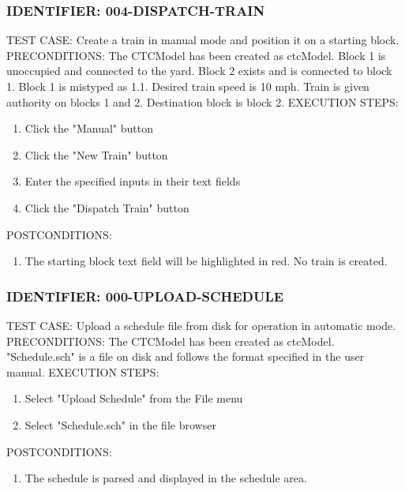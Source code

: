 \documentclass{scrreprt}
\begin{document}
\subsubsection{IDENTIFIER: 004-DISPATCH-TRAIN}
TEST CASE: Create a train in manual mode and position it on a starting block.
PRECONDITIONS: The CTCModel has been created as ctcModel. Block 1 is unoccupied and connected to the yard. Block 2 exists and is connected to block 1. Block 1 is mistyped as 1.1. Desired train speed is 10 mph. Train is given authority on blocks 1 and 2. Destination block is block 2.
EXECUTION STEPS:
\begin{enumerate}
	\item Click the "Manual" button
	\item Click the "New Train" button
	\item Enter the specified inputs in their text fields
	\item Click the "Dispatch Train" button
\end{enumerate}
POSTCONDITIONS:
\begin{enumerate}
	\item The starting block text field will be highlighted in red. No train is created.
\end{enumerate}

\subsubsection{IDENTIFIER: 000-UPLOAD-SCHEDULE}
TEST CASE: Upload a schedule file from disk for operation in automatic mode.
PRECONDITIONS: The CTCModel has been created as ctcModel. "Schedule.sch" is a file on disk and follows the format specified in the user manual.
EXECUTION STEPS:
\begin{enumerate}
	\item Select "Upload Schedule" from the File menu
	\item Select "Schedule.sch" in the file browser
\end{enumerate}
POSTCONDITIONS:
\begin{enumerate}
	\item The schedule is parsed and displayed in the schedule area.
\end{enumerate}
\end{document}
